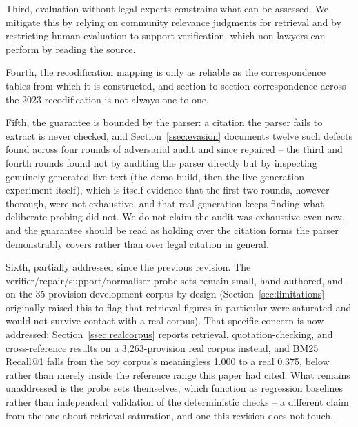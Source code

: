 \documentclass[conference]{IEEEtran}
\begin{document}
Third, evaluation without legal experts constrains what can be assessed. We mitigate this by relying on community relevance judgments for retrieval and by restricting human evaluation to support verification, which non-lawyers can perform by reading the source.

Fourth, the recodification mapping is only as reliable as the correspondence tables from which it is constructed, and section-to-section correspondence across the 2023 recodification is not always one-to-one.

Fifth, the guarantee is bounded by the parser: a citation the parser fails to extract is never checked, and Section~\ref{ssec:evasion} documents twelve such defects found across four rounds of adversarial audit and since repaired -- the third and fourth rounds found not by auditing the parser directly but by inspecting genuinely generated live text (the demo build, then the live-generation experiment itself), which is itself evidence that the first two rounds, however thorough, were not exhaustive, and that real generation keeps finding what deliberate probing did not. We do not claim the audit was exhaustive even now, and the guarantee should be read as holding over the citation forms the parser demonstrably covers rather than over legal citation in general.

Sixth, partially addressed since the previous revision. The verifier/repair/support/normaliser probe sets remain small, hand-authored, and on the 35-provision development corpus by design (Section~\ref{sec:limitations} originally raised this to flag that retrieval figures in particular were saturated and would not survive contact with a real corpus). That specific concern is now addressed: Section~\ref{ssec:realcorpus} reports retrieval, quotation-checking, and cross-reference results on a 3{,}263-provision real corpus instead, and BM25 Recall@1 falls from the toy corpus's meaningless 1.000 to a real 0.375, below rather than merely inside the reference range this paper had cited. What remains unaddressed is the probe sets themselves, which function as regression baselines rather than independent validation of the deterministic checks -- a different claim from the one about retrieval saturation, and one this revision does not touch.
\end{document}
